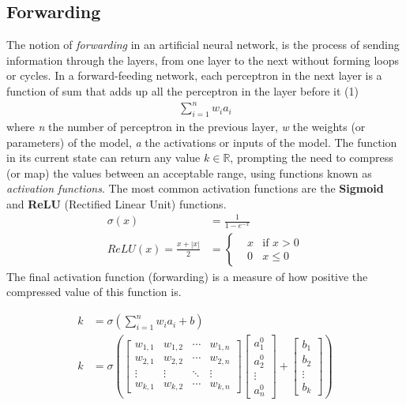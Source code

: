 \documentclass[12pt]{article}
\begin{document}
    \subsection{Forwarding} 
    The notion of \textit{forwarding} in an artificial neural network, is the process of sending information through the layers,
    from one layer to the next without forming loops or cycles. 
    In a forward-feeding network, each perceptron in the next layer is a function of sum that adds up all the perceptron in the
    layer before it (1)
    \begin{align} 
        \sum_{i = 1}^{n} w_{i}a_{i} 
    \end{align}
    where \textit{n} the number of perceptron in the previous layer, \textit{w} the weights (or parameters) of the model, 
    \textit{a} the activations or inputs of the model.
    The function in its current state can return any value $k \in \mathbb{R}$, prompting the need to compress (or map) 
    the values between an acceptable range, using functions known as \textit{activation functions}. The most common 
    activation functions are the \textbf{Sigmoid} and \textbf{ReLU} (Rectified Linear Unit) functions.
    \begin{align*} 
        \sigma(x) &= \frac{1}{1 - e^{-x}} \tag{Sigmoid function} \\ 
        ReLU(x) = \frac{x + |x|}{2} &=
        \left\{
            \begin{aligned}
                &x &\text{if } x > 0 \\
                &0 &x \le 0
            \end{aligned}
        \right.
        \tag{ReLU function}
    \end{align*}
    The final activation function (forwarding) is a measure of how positive the compressed value of this function is.
    
    \begin{align}
        k &= \sigma\left(\sum_{i=1}^{n} w_{i}a_{i} + b\right) \\
        k &= \sigma\left(
            \begin{bmatrix}
                w_{1,1} & w_{1,2} & \cdots & w_{1,n} \\
                w_{2,1} & w_{2,2} & \cdots & w_{2,n} \\
                \vdots  & \vdots  & \ddots & \vdots  \\
                w_{k,1} & w_{k,2} & \cdots & w_{k,n}
            \end{bmatrix}
            \begin{bmatrix}
                a_{1}^{0} \\ a_{2}^{0}\\ \vdots \\ a_{n}^{0} 
            \end{bmatrix}
            +
            \begin{bmatrix}
                b_{1} \\ b_{2} \\ \vdots \\ b_{k}
            \end{bmatrix}
        \right)
    \end{align}
    
\end{document}
